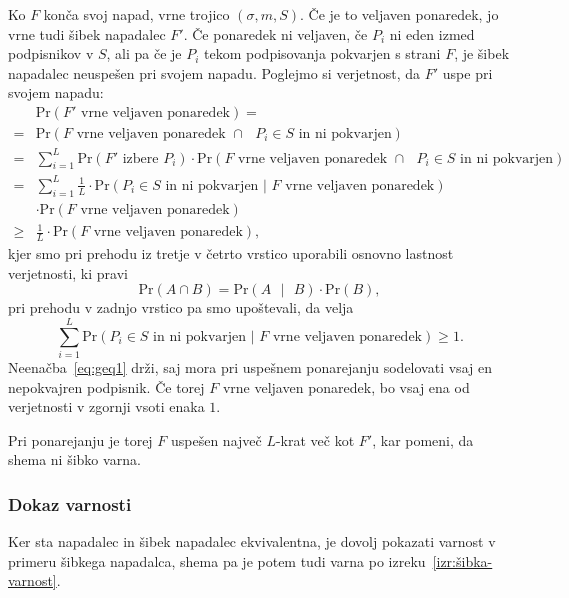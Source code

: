 \documentclass[isrm2, tisk]{fmfdelo}
\begin{document}
\begin{dokaz}
    Ko $F$ konča svoj napad, vrne trojico $(\sigma, m, S)$. Če je to veljaven ponaredek, jo vrne tudi
    šibek napadalec $F'$. Če ponaredek ni veljaven, če $P_i$ ni eden izmed podpisnikov v $S$, ali pa
    če je $P_i$ tekom podpisovanja pokvarjen s strani $F$, je šibek napadalec neuspešen pri svojem napadu.
    Poglejmo si verjetnost, da $F'$ uspe pri svojem napadu:
    \begin{align*}
          &\text{Pr}(\text{$F'$ vrne veljaven ponaredek}) = \\
        = &\text{Pr}(\text{$F$ vrne veljaven ponaredek } \cap \text{ $P_i \in S$ in ni pokvarjen}) \\
        = &\sum_{i=1}^L \text{Pr}(\text{$F'$ izbere $P_i$}) \cdot 
            \text{Pr}(\text{$F$ vrne veljaven ponaredek } \cap \text{ $P_i \in S$ in ni pokvarjen}) \\
        = &\sum_{i=1}^L \frac{1}{L} \cdot 
            \text{Pr}(\text{$P_i \in S$ in ni pokvarjen | $F$ vrne veljaven ponaredek}) \\
          &\cdot \text{Pr}(\text{$F$ vrne veljaven ponaredek}) \\
        \geq &\frac{1}{L} \cdot \text{Pr}(\text{$F$ vrne veljaven ponaredek}),
    \end{align*}
    kjer smo pri prehodu iz tretje v četrto vrstico uporabili osnovno lastnost verjetnosti, ki pravi
    $$
    \text{Pr}(A \cap B) = \text{Pr}(A \text{ }|\text{ } B) \cdot \text{Pr}(B),
    $$
    pri prehodu v zadnjo vrstico pa smo upoštevali, da velja
    \begin{equation}
    \label{eq:geq1}
    \sum_{i=1}^L \text{Pr}(\text{$P_i \in S$ in ni pokvarjen | $F$ vrne veljaven ponaredek}) \geq 1.
    \end{equation}
    Neenačba~\eqref{eq:geq1} drži, saj mora pri uspešnem ponarejanju sodelovati vsaj en nepokvajren
    podpisnik. Če torej $F$ vrne veljaven ponaredek, bo vsaj ena od verjetnosti v zgornji vsoti enaka $1$.

    Pri ponarejanju je torej $F$ uspešen največ $L$-krat več kot $F'$, kar pomeni, da shema ni šibko
    varna.
\end{dokaz}

\subsubsection{Dokaz varnosti}
Ker sta napadalec in šibek napadalec ekvivalentna, je dovolj pokazati varnost v primeru šibkega
napadalca, shema pa je potem tudi varna po izreku~\ref{izr:šibka-varnost}.
\end{document}
